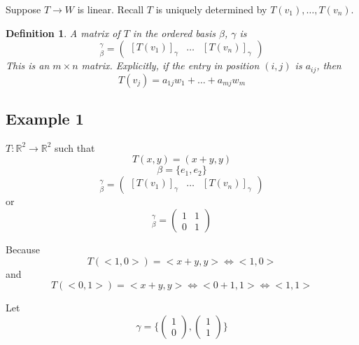 \documentclass{article}
\newtheorem{definition}[theorem]{Definition}
\newtheorem{one minute paper}[theorem]{One Minute Paper}
\begin{document}
Suppose $T \rightarrow W$ is linear. Recall $T$ is uniquely determined by $T(v_1), \dots, T(v_n)$.

\begin{definition}
    A matrix of $T$ in the ordered basis $\beta$, $\gamma$ is 
    \begin{equation}
        [T]_\beta^\gamma = \begin{pmatrix}
            [T(v_1)]_\gamma & \dots & [T(v_n)]_\gamma
        \end{pmatrix}
    \end{equation}
    This is an $m \times n$ matrix. Explicitly, if the entry in position $(i,j)$ is $a_{ij}$, then 
    \begin{equation}
        T(v_j) = a_{1j}w_1 + \dots + a_{mj}w_m
    \end{equation}
\end{definition}

\subsection*{Example 1}

$T: \mathbb{R}^2 \rightarrow \mathbb{R}^2$ such that 
\begin{equation}
    T(x,y) = (x+y,y)
\end{equation}
\begin{equation}
    \beta = \{e_1,e_2\}
\end{equation}
\begin{equation}
    [T]_\beta^\gamma = \begin{pmatrix}
        [T(v_1)]_\gamma & \dots & [T(v_n)]_\gamma
    \end{pmatrix}
\end{equation}
or 
\begin{equation}
    [T]_\beta^\gamma = \begin{pmatrix}
        1 & 1 \\
        0 & 1
    \end{pmatrix}
\end{equation}

Because 
\begin{equation}
    T(<1,0>) = <x+y, y> \iff <1, 0> 
\end{equation}
and 
\begin{equation}
    T(<0,1>) = <x+y,y> \iff <0 + 1, 1> \iff <1,1>
\end{equation}

Let 
\begin{equation}
    \gamma = \{\begin{pmatrix}
        1 \\
        0
    \end{pmatrix}, \begin{pmatrix}
        1 \\ 
        1
    \end{pmatrix}\}
\end{equation}
\end{document}
